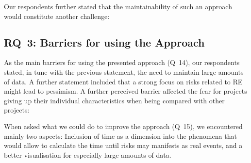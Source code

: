 \documentclass[lnbip]{svmultln}
\begin{document}
Our respondents further stated that the maintainability of such an approach would constitute another challenge:
\begin{center}
\setlength\fboxsep{0pt}
  \setlength\fboxrule{0pt}
\colorbox{lightgray}{
}
\end{center}



\subsection{RQ~3: Barriers for using the Approach}

As the main barriers for using the presented approach (Q~14), our respondents stated, in tune with the previous statement, the need to maintain large amounts of data. A further statement included that a strong focus on risks related to RE might lead to pessimism. A further perceived barrier affected the fear for projects giving up their individual characteristics when being compared with other projects:

\begin{center}
\setlength\fboxsep{0pt}
  \setlength\fboxrule{0pt}
\colorbox{lightgray}{
}
\end{center}

When asked what we could do to improve the approach (Q~15), we encountered mainly two aspects: Inclusion of time as a dimension into the phenomena that would allow to calculate the time until risks may manifests as real events, and a better visualisation for especially large amounts of data.
\end{document}

